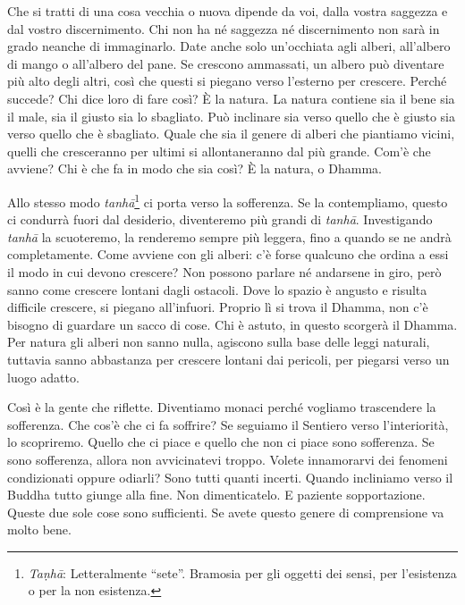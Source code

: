 Che si tratti di una cosa vecchia o nuova dipende da voi, dalla vostra
saggezza e dal vostro discernimento. Chi non ha né saggezza né
discernimento non sarà in grado neanche di immaginarlo. Date anche solo
un'occhiata agli alberi, all'albero di mango o all'albero del pane. Se
crescono ammassati, un albero può diventare più alto degli altri, così
che questi si piegano verso l'esterno per crescere. Perché succede? Chi
dice loro di fare così? È la natura. La natura contiene sia il bene sia
il male, sia il giusto sia lo sbagliato. Può inclinare sia verso quello
che è giusto sia verso quello che è sbagliato. Quale che sia il genere
di alberi che piantiamo vicini, quelli che cresceranno per ultimi si
allontaneranno dal più grande. Com'è che avviene? Chi è che fa in modo
che sia così? È la natura, o Dhamma.

Allo stesso modo \emph{tanhā}\footnote{\emph{Taṇhā}: Letteralmente
  ``sete''. Bramosia per gli oggetti dei sensi, per l'esistenza o per la
  non esistenza.} ci porta verso la sofferenza. Se la contempliamo,
questo ci condurrà fuori dal desiderio, diventeremo più grandi di
\emph{tanhā}. Investigando \emph{tanhā} la scuoteremo, la renderemo
sempre più leggera, fino a quando se ne andrà completamente. Come
avviene con gli alberi: c'è forse qualcuno che ordina a essi il modo in
cui devono crescere? Non possono parlare né andarsene in giro, però
sanno come crescere lontani dagli ostacoli. Dove lo spazio è angusto e
risulta difficile crescere, si piegano all'infuori. Proprio lì si trova
il Dhamma, non c'è bisogno di guardare un sacco di cose. Chi è astuto,
in questo scorgerà il Dhamma. Per natura gli alberi non sanno nulla,
agiscono sulla base delle leggi naturali, tuttavia sanno abbastanza per
crescere lontani dai pericoli, per piegarsi verso un luogo adatto.

Così è la gente che riflette. Diventiamo monaci perché vogliamo
trascendere la sofferenza. Che cos'è che ci fa soffrire? Se seguiamo il
Sentiero verso l'interiorità, lo scopriremo. Quello che ci piace e
quello che non ci piace sono sofferenza. Se sono sofferenza, allora non
avvicinatevi troppo. Volete innamorarvi dei fenomeni condizionati oppure
odiarli? Sono tutti quanti incerti. Quando incliniamo verso il Buddha
tutto giunge alla fine. Non dimenticatelo. E paziente sopportazione.
Queste due sole cose sono sufficienti. Se avete questo genere di
comprensione va molto bene.

